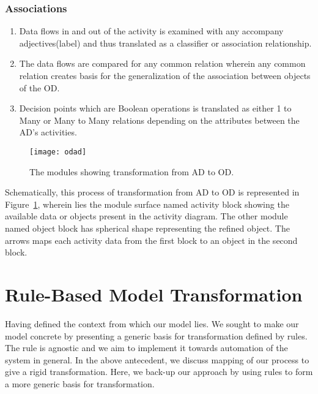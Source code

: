 \documentclass[10pt]{article}
\begin{document}
\subsubsection{Associations}
\begin{enumerate}
\item Data flows in and out of the activity is examined with any accompany adjectives(label) and thus translated as a classifier or association relationship.
\item The data flows are compared for any common relation wherein any common relation creates basis for the generalization of the association between objects of the OD.
\item Decision points which are Boolean operations is translated as either 1 to Many or Many to Many relations depending on the attributes between the AD's activities.
\end{enumerate}

\begin{figure}[!ht]
  \centering
   \texttt{[image: odad]}
  \caption{The modules showing transformation from AD to OD.}
  \label{fig:odad}
\end{figure}

Schematically, this process of transformation from AD to OD is represented in Figure~\ref{fig:odad}, wherein lies the module surface named activity block showing the available data or objects present in the activity diagram. The other module named object block has spherical shape representing the refined object. The arrows maps each activity data from the first block to an object in the second block.
\section{Rule-Based Model Transformation}
Having defined the context from which our model lies. We sought to make our model concrete by presenting a generic basis for transformation defined by rules. The rule is agnostic and we aim to implement it towards automation of the system in general. In the above antecedent, we discuss mapping of our process to give a rigid transformation. Here, we back-up our approach by using rules to form a more generic basis for transformation.
\end{document}
